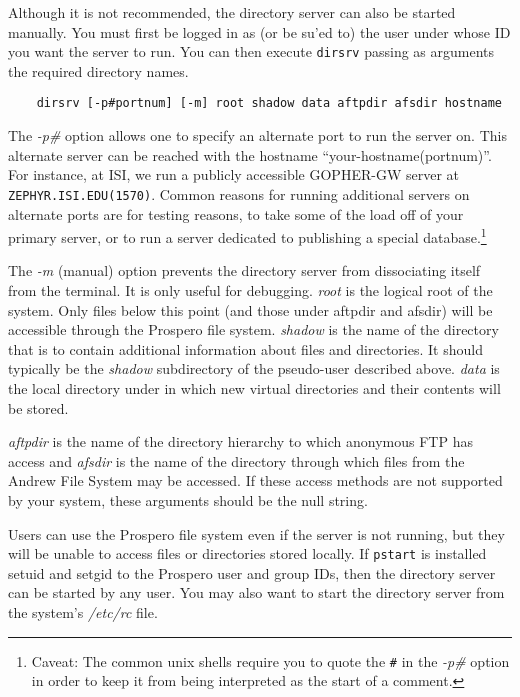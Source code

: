 Although it is not recommended, the directory server can also be
started manually.  You must first be logged in as (or be su'ed to) the
user under whose ID you want the server to run.  You can then execute
{\tt dirsrv} passing as arguments the required directory names.

\begin{verbatim}
    dirsrv [-p#portnum] [-m] root shadow data aftpdir afsdir hostname
\end{verbatim}
   
The {\em -p\#} option allows one to specify an alternate port to run 
the server on.  This alternate server can be reached with the hostname
``your-hostname(portnum)''.  For instance, at ISI, we run a publicly
accessible GOPHER-GW server at {\tt ZEPHYR.ISI.EDU(1570)}.  
Common reasons for running additional servers on alternate ports are
for testing reasons,  to take some of the load off of your primary
server, or to run a server dedicated to publishing a special
database.\footnote{Caveat: The common {\sc unix} shells require you to
quote the {\tt \#} in the {\em -p\#} option in order to keep it from
being interpreted as the start of a comment.}

The {\em -m} (manual) option prevents the directory server from
dissociating itself from the terminal.  It is only useful for
debugging.  {\em root} is the logical root of the system.  Only files
below this point (and those under aftpdir and afsdir) will be
accessible through the Prospero file system.  {\em shadow} is the name
of the directory that is to contain additional information about files
and directories.  It should typically be the {\it shadow} subdirectory
of the pseudo-user described above.  {\em data} is the local directory
under in which new virtual directories and their contents will be
stored.

{\em aftpdir} is the name of the directory hierarchy to which
anonymous FTP has access and {\em afsdir} is the name of the directory
through which files from the Andrew File System may be accessed.  If
these access methods are not supported by your system, these arguments
should be the null string.

Users can use the Prospero file system even if the server is not
running, but they will be unable to access files or directories stored
locally.  If {\tt pstart} is installed setuid and setgid to the
Prospero user and group IDs, then the directory server can be started
by any user.  You may also want to start the directory server from the
system's {\it /etc/rc} file.

